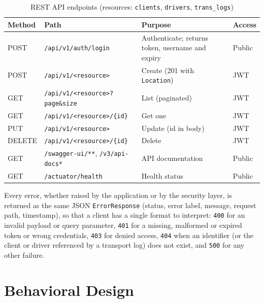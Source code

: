 \begin{table}[htbp]
\centering
\caption{REST API endpoints (resources: \texttt{clients}, \texttt{drivers}, \texttt{trans\_logs})}
\label{tab:api}
\renewcommand{\arraystretch}{1.1}
\small
\begin{tabularx}{\linewidth}{@{}l l >{\raggedright\arraybackslash}X l@{}}
\toprule
\textbf{Method} & \textbf{Path} & \textbf{Purpose} & \textbf{Access} \\
\midrule
POST & \texttt{/api/v1/auth/login} & Authenticate; returns token, username and expiry & Public \\
POST & \texttt{/api/v1/<resource>} & Create (201 with \texttt{Location}) & JWT \\
GET & \texttt{/api/v1/<resource>?page\&size} & List (paginated) & JWT \\
GET & \texttt{/api/v1/<resource>/\{id\}} & Get one & JWT \\
PUT & \texttt{/api/v1/<resource>} & Update (id in body) & JWT \\
DELETE & \texttt{/api/v1/<resource>/\{id\}} & Delete & JWT \\
GET & \texttt{/swagger-ui/**}, \texttt{/v3/api-docs*} & API documentation & Public \\
GET & \texttt{/actuator/health} & Health status & Public \\
\bottomrule
\end{tabularx}
\end{table}

Every error, whether raised by the application or by the security layer, is returned as the same JSON \texttt{ErrorResponse} (status, error label, message, request path, timestamp), so that a client has a single format to interpret: \texttt{400} for an invalid payload or query parameter, \texttt{401} for a missing, malformed or expired token or wrong credentials, \texttt{403} for denied access, \texttt{404} when an identifier (or the client or driver referenced by a transport log) does not exist, and \texttt{500} for any other failure.

\section{Behavioral Design}

